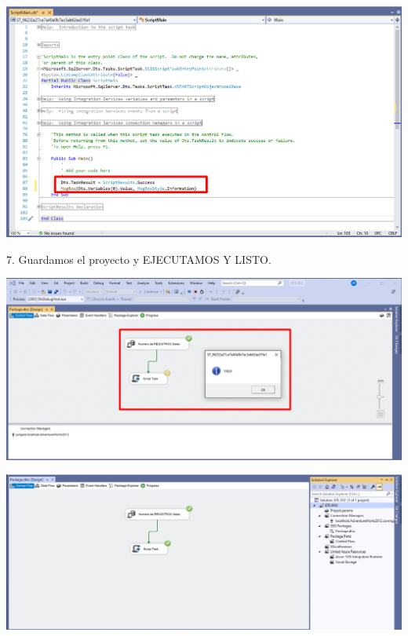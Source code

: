 \documentclass[12pt,letterpaper]{article}
\begin{document}
	\begin{center}
	\includegraphics[width=17cm]{./img/41}
	\end{center}
7. Guardamos el proyecto y EJECUTAMOS Y LISTO.
	\begin{center}
	\includegraphics[width=17cm]{./img/42}
	\end{center}
	\begin{center}
	\includegraphics[width=17cm]{./img/43}
	\end{center}
	
\end{document}
